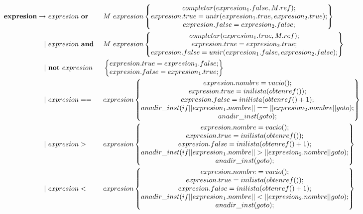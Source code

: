 \documentclass[12pt,a4paper,landscape]{article}
\theoremstyle{mytheor}
\begin{document}
\begin{center}
  \begin{alignat*}{2}
     \text{\textbf{expresion}} \to\ &  expresion\ \textbf{or} && M\ expresion \begin{Bmatrix} completar(expresion_1.false, M.ref);\\ expresion.true=unir(expresion_1.true, expresion_2.true); \\  expresion.false=expresion_2.false;\end{Bmatrix} \\
      |\ & expresion\ \textbf{and}\ && M\ expresion  \begin{Bmatrix} completar(expresion_1.true, M.ref);\\ expresion.true=expresion_2.true; \\  expresion.false=unir(expresion_1.false, expresion_2.false);\end{Bmatrix}\\
      |\ & \textbf{not}\ expresion && \begin{Bmatrix} expresion.true=expresion_1.false; \\  expresion.false=expresion_1.true;\end{Bmatrix}\\
     |\ & expresion == && expresion \begin{Bmatrix} expresion.nombre = vacio();\\ expresion.true=inilista(obtenref()); \\  expresion.false=inilista(obtenref()+1);\\ anadir\_inst(if||expresion_1.nombre||==||expresion_2.nombre||goto);\\ anadir\_inst(goto);\end{Bmatrix} \\
    |\ & expresion > && expresion  \begin{Bmatrix} expresion.nombre = vacio();\\ expresion.true=inilista(obtenref()); \\  expresion.false=inilista(obtenref()+1);\\ anadir\_inst(if||expresion_1.nombre||>||expresion_2.nombre||goto);\\ anadir\_inst(goto);\end{Bmatrix} \\
    |\ & expresion < && expresion  \begin{Bmatrix} expresion.nombre = vacio();\\ expresion.true=inilista(obtenref()); \\  expresion.false=inilista(obtenref()+1);\\ anadir\_inst(if||expresion_1.nombre||<||expresion_2.nombre||goto);\\ anadir\_inst(goto);\end{Bmatrix} \\

\end{alignat*}
\end{center}
\end{document}
